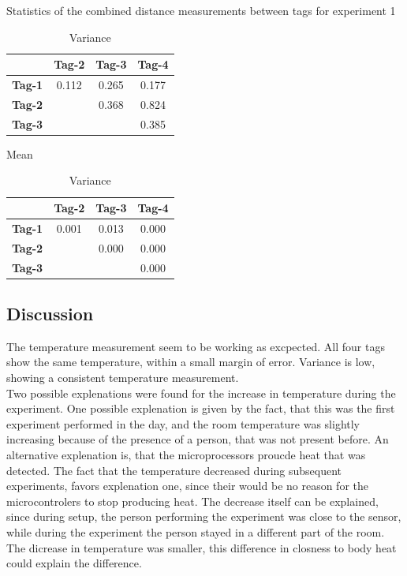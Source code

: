 \begin{table}[ht]
\centering
\caption{Statistics of the combined distance measurements between tags for experiment 1}
\begin{minipage}{0.45\textwidth}
\centering
\begin{tabular}{|c|c c c|}
\hline
		& \textbf{Tag-2} & \textbf{Tag-3} & \textbf{Tag-4} \\
\hline
\textbf{Tag-1}    & 0.112 & 0.265 & 0.177 \\
\textbf{Tag-2}   &  & 0.368 & 0.824 \\
\textbf{Tag-3}   &  &  & 0.385 \\
\hline
\end{tabular}
\caption*{Mean}
\end{minipage}
\hfill
\begin{minipage}{0.45\textwidth}
\centering
\begin{tabular}{|c|c c c|}
\hline
		& \textbf{Tag-2} & \textbf{Tag-3} & \textbf{Tag-4} \\
\hline
\textbf{Tag-1}    & 0.001 & 0.013 & 0.000 \\
\textbf{Tag-2}   &  & 0.000 & 0.000 \\
\textbf{Tag-3}   &  &  & 0.000 \\
\hline
\end{tabular}
\caption*{Variance}
\end{minipage}
\label{tab:exp1_var_distanc}
\end{table}


\subsection{Discussion}
\label{s:exp1_conclustion}
The temperature measurement seem to be working as excpected.
All four tags show the same temperature, within a small margin of error.
Variance is low, showing a consistent temperature measurement.\\
Two possible explenations were found for the increase in temperature during the experiment.
One possible explenation is given by the fact, that this was the first experiment performed in the day, and the room temperature was slightly increasing because of the presence of a person, that was not present before.
An alternative explenation is, that the microprocessors proucde heat that was detected.
The fact that the temperature decreased during subsequent experiments, favors explenation one, since their would be no reason for the microcontrolers to stop producing heat.
The decrease itself can be explained, since during setup, the person performing the experiment was close to the sensor, while during the experiment the person stayed in a different part of the room. The dicrease in temperature was smaller, this difference in closness to body heat could explain the difference.


